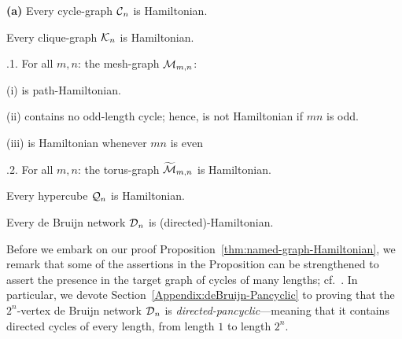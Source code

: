 \begin{prop}
\label{thm:named-graph-Hamiltonian}
\label{thm:deBruijn-Hamiltonian}
{\bf (a)}
Every cycle-graph $\mbox{$\cal C$}_n$ is Hamiltonian.

Every clique-graph $\mbox{$\cal K$}_n$ is Hamiltonian.

.1.
For all $m,n$: the mesh-graph $\mbox{$\cal M$}_{m,n}$:

(i)  is path-Hamiltonian.

(ii) contains no odd-length cycle; hence, is not Hamiltonian if $mn$
is odd.

(iii) is Hamiltonian whenever $mn$ is even 

.2.
For all $m,n$: the torus-graph $\widetilde{\mbox{$\cal M$}}_{m,n}$ is Hamiltonian.

Every hypercube $\mbox{$\cal Q$}_n$  is Hamiltonian.

Every de Bruijn network $\mbox{$\cal D$}_n$ is (directed)-Hamiltonian.
\end{prop}
 
  
Before we embark on our proof Proposition~\ref{thm:named-graph-Hamiltonian}, we
remark that some of the assertions in the Proposition can be strengthened to assert
the presence in the target graph of cycles of many lengths; cf.~\cite{Rosenberg91}.
In particular, we devote Section~\ref{Appendix:deBruijn-Pancyclic} to proving that the
$2^n$-vertex de Bruijn network $\mbox{$\cal D$}_n$ is {\it directed-pancyclic}---meaning that it contains
directed cycles of every length, from length $1$ to length $2^n$.

